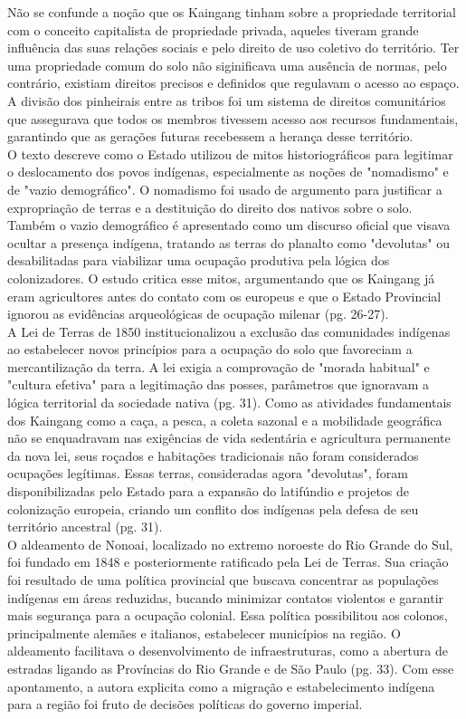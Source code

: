 \documentclass[12pt, a4paper]{article}
\begin{document}
Não se confunde a noção que os Kaingang tinham sobre a propriedade territorial com o conceito capitalista de propriedade privada, aqueles tiveram grande influência das suas relações sociais e pelo direito de uso coletivo do território. Ter uma propriedade comum do solo não siginificava uma ausência de normas, pelo contrário, existiam direitos precisos e definidos que regulavam o acesso ao espaço. A divisão dos pinheirais entre as tribos foi um sistema de direitos comunitários que assegurava que todos os membros tivessem acesso aos recursos fundamentais, garantindo que as gerações futuras recebessem a herança desse território.
\\

O texto descreve como o Estado utilizou de mitos historiográficos para legitimar o deslocamento dos povos indígenas, especialmente as noções de "nomadismo" e de "vazio demográfico". O nomadismo foi usado de argumento para justificar a expropriação de terras e a destituição do direito dos nativos sobre o solo. Também o vazio demográfico é apresentado como um discurso oficial que visava ocultar a presença indígena, tratando as terras do planalto como "devolutas" ou desabilitadas para viabilizar uma ocupação produtiva pela lógica dos colonizadores. O estudo critica esse mitos, argumentando que os Kaingang já eram agricultores antes do contato com os europeus e que o Estado Provincial ignorou as evidências arqueológicas de ocupação milenar (pg. 26-27).
\\

A Lei de Terras de 1850 institucionalizou a exclusão das comunidades indígenas ao estabelecer novos princípios para a ocupação do solo que favoreciam a mercantilização da terra. A lei exigia a comprovação de "morada habitual" e "cultura efetiva" para a legitimação das posses, parâmetros que ignoravam a lógica territorial da sociedade nativa (pg. 31). Como as atividades fundamentais dos Kaingang como a caça, a pesca, a coleta sazonal e a mobilidade geográfica não se enquadravam nas exigências de vida sedentária e agricultura permanente da nova lei, seus roçados e habitações tradicionais não foram considerados ocupações legítimas. Essas terras, consideradas agora "devolutas", foram disponibilizadas pelo Estado para a expansão do latifúndio e projetos de colonização europeia, criando um conflito dos indígenas pela defesa de seu território ancestral (pg. 31).
\\


O aldeamento de Nonoai, localizado no extremo noroeste do Rio Grande do Sul, foi fundado em 1848 e posteriormente ratificado pela Lei de Terras. Sua criação foi resultado de uma política provincial que buscava concentrar as populações indígenas em áreas reduzidas, bucando minimizar contatos violentos e garantir mais segurança para a ocupação colonial. Essa política possibilitou aos colonos, principalmente alemães e italianos, estabelecer municípios na região. O aldeamento facilitava o desenvolvimento de infraestruturas, como a abertura de estradas ligando as Províncias do Rio Grande e de São Paulo (pg. 33). Com esse apontamento, a autora explicita como a migração e estabelecimento indígena para a região foi fruto de decisões políticas do governo imperial.
\\
\end{document}
